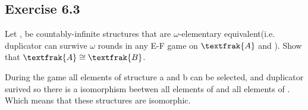 \documentclass{article}
\newcommand{\ga}{\textfrak{A}}
\newcommand{\gb}{\textfrak{B}}
\begin{document}
\subsection*{Exercise 6.3}
Let \ga, \gb be countably-infinite structures  that are $\omega$-elementary equivalent(i.e. duplicator can surwive $\omega$ rounds in any E-F game on $\ga$ and \gb). Show that $\ga \cong \gb$.


During the game all elements of structure a and b can be selected, and duplicator surived so there is a isomorphism beetwen all elements of \ga and all elements of \gb. Which means that these structures are isomorphic.
\end{document}
